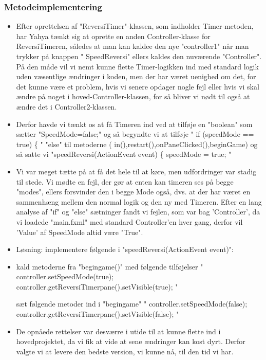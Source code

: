 \subsubsection{Metodeimplementering}\label{MI}
\begin{itemize}
\item Efter oprettelsen af "ReversiTimer"-klassen, som indholder Timer-metoden, har Yahya tænkt sig at oprette en anden Controller-klasse for ReversiTimeren, således at man kan kaldee den nye "controller1" når man trykker på knappen " SpeedReversi" ellers kaldes den nuværende "Controller".
På den måde vil vi nemt kunne flette Timer-logikken ind med standard logik uden væsentlige ændringer i koden, men der har været uenighed om det, for det kunne være et problem, hvis vi senere opdager nogle fejl eller hvis vi skal ændre på noget i hoved-Controller-klassen, for så bliver vi nødt til også at ændre det i Controller2-klassen. 
\item Derfor havde vi tænkt os at få Timeren ind ved at tilføje en "boolean" som sætter "SpeedMode=false;" og så begyndte vi at tilføje 
" if (speedMode == true) \{ " "else" til metoderne ( in(),restart(),onPaneClicked(),beginGame) og så satte vi 
"speedReversi(ActionEvent event) \{	
		speedMode = true; "
\item Vi var meget tætte på at få det hele til at køre, men udfordringer var stadig til stede. Vi mødte en fejl, der gør at enten kan timeren ses på begge "modes", ellers forsvinder den i begge Mode også, dvs. at der har været en sammenhæng mellem den normal logik og den ny med Timeren.
Efter en lang analyse af "if" og "else" sætninger fandt vi fejlen, som var bag 'Controller', da vi loadede "main.fxml" med standard Controller'en hver gang, derfor vil 'Value' af SpeedMode altid være "True". 

\item Løsning: 
implementere følgende i "speedReversi(ActionEvent event)":
\item kald metoderne fra "begingame()" med følgende tilføjelser 
" controller.setSpeedMode(true);
            controller.getReversiTimerpane().setVisible(true); " 

   sæt følgende metoder ind i "begingame"
   " controller.setSpeedMode(false);
        controller.getReversiTimerpane().setVisible(false); "

\item De opnåede rettelser var desværre i utide til at kunne flette ind i hovedprojektet, da vi fik at vide at sene ændringer kan kost dyrt. Derfor valgte vi at levere den bedste version, vi kunne nå, til den tid vi har. 
\end{itemize}








